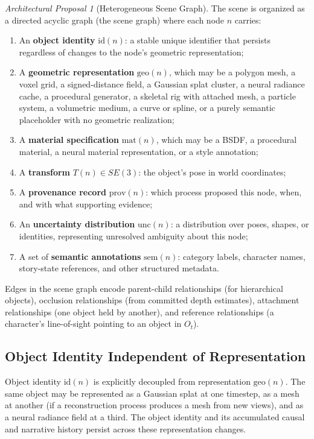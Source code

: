 \documentclass[11pt,a4paper]{article}
\theoremstyle{plain}
\theoremstyle{definition}
\theoremstyle{remark}
\newtheorem{proposal}[theorem]{Architectural Proposal}
\begin{document}
\begin{proposal}[Heterogeneous Scene Graph]
The scene is organized as a directed acyclic graph (the scene graph) where each node $n$ carries:
\begin{enumerate}[leftmargin=2em,itemsep=0pt]
\item An \textbf{object identity} $\mathrm{id}(n)$: a stable unique identifier that persists regardless of changes to the node's geometric representation;
\item A \textbf{geometric representation} $\mathrm{geo}(n)$, which may be a polygon mesh, a voxel grid, a signed-distance field, a Gaussian splat cluster, a neural radiance cache, a procedural generator, a skeletal rig with attached mesh, a particle system, a volumetric medium, a curve or spline, or a purely semantic placeholder with no geometric realization;
\item A \textbf{material specification} $\mathrm{mat}(n)$, which may be a BSDF, a procedural material, a neural material representation, or a style annotation;
\item A \textbf{transform} $T(n) \in SE(3)$: the object's pose in world coordinates;
\item A \textbf{provenance record} $\mathrm{prov}(n)$: which process proposed this node, when, and with what supporting evidence;
\item An \textbf{uncertainty distribution} $\mathrm{unc}(n)$: a distribution over poses, shapes, or identities, representing unresolved ambiguity about this node;
\item A set of \textbf{semantic annotations} $\mathrm{sem}(n)$: category labels, character names, story-state references, and other structured metadata.
\end{enumerate}
Edges in the scene graph encode parent-child relationships (for hierarchical objects), occlusion relationships (from committed depth estimates), attachment relationships (one object held by another), and reference relationships (a character's line-of-sight pointing to an object in $O_t$).
\end{proposal}

\subsection{Object Identity Independent of Representation}

Object identity $\mathrm{id}(n)$ is explicitly decoupled from representation $\mathrm{geo}(n)$. The same object may be represented as a Gaussian splat at one timestep, as a mesh at another (if a reconstruction process produces a mesh from new views), and as a neural radiance field at a third. The object identity and its accumulated causal and narrative history persist across these representation changes.
\end{document}
